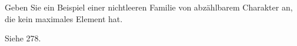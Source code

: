 
\begin{exercise}[279]

Geben Sie ein Beispiel einer nichtleeren Familie von abzählbarem Charakter an,
die kein maximales Element hat.

\end{exercise}


\begin{solution}

Siehe 278.

\end{solution}

